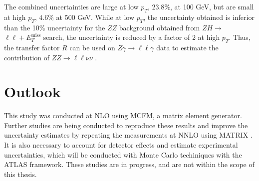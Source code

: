 \documentclass[12pt,a4paper,openright,twoside]{report}
\newcommand{\ZZ}{$ZZ\to \ell\ell\nu\nu$ }
\newcommand{\Zg}{$Z\gamma\to \ell\ell\gamma$ }
\newcommand{\llM}{$\ell\ell+E_T^{\mathrm{miss}}$ }
\begin{document}
The combined uncertainties are large at low $p_T$, $23.8\%$, at 100 GeV, but are small at high $p_T$, $4.6\%$ at 500 GeV. While at low $p_T$, the uncertainty obtained is inferior than the 10\% uncertainty for the $ZZ$ background obtained from $ZH\to$\llM search, the uncertainty is reduced by a factor of 2 at high $p_T$. Thus, the transfer factor $R$ can be used on \Zg data to estimate the contribution of \ZZ.

\section{Outlook}
This study was conducted at NLO using MCFM, a matrix element generator. Further studies are being conducted to reproduce these results and improve the uncertainty estimates by repeating the measurements at NNLO using MATRIX \cite{MATRIX}. It is also necessary to account for detector effects and estimate experimental uncertainties, which will be conducted with Monte Carlo techiniques with the ATLAS framework. These studies are in progress, and are not within the scope of this thesis.



\end{document}
